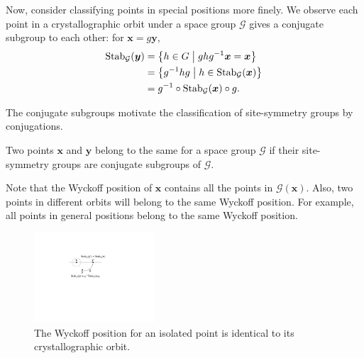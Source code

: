 Now, consider classifying points in special positions more finely.
We observe each point in a crystallographic orbit under a space group $\mathcal{G}$ gives a conjugate subgroup to each other: for $\bm{x} = g \bm{y}$,
\begin{align}
  \mathrm{Stab}_{\mathcal{G}}(\bm{y})
    &= \left\{  h \in G  \mathrel{}\middle|\mathrel{}  ghg^{-1}\bm{x} = \bm{x}  \right\} \nonumber \\
    &= \left\{  g^{-1} h g  \mathrel{}\middle|\mathrel{}  h \in \mathrm{Stab}_{\mathcal{G}}(\bm{x})  \right\} \nonumber \\
    &= g^{-1} \circ \mathrm{Stab}_{\mathcal{G}}(\bm{x}) \circ g.
\end{align}

The conjugate subgroups motivate the classification of site-symmetry groups by conjugations.
\begin{screen}
  \begin{defn}
    Two points $\bm{x}$ and $\bm{y}$ belong to the same  for a space group $\mathcal{G}$ if their site-symmetry groups are conjugate subgroups of $\mathcal{G}$.
  \end{defn}
\end{screen}

Note that the Wyckoff position of $\bm{x}$ contains all the points in $\mathcal{G}(\bm{x})$.
Also, two points in different orbits will belong to the same Wyckoff position.
For example, all points in general positions belong to the same Wyckoff position.

\begin{figure}[htb]
  \centering
  \includegraphics[width=0.4\textwidth]{figure/fig_wyckoff.pdf}
  \caption{The Wyckoff position for an isolated point is identical to its crystallographic orbit.}
  \label{fig:isolated-wyckoff-position}
\end{figure}

